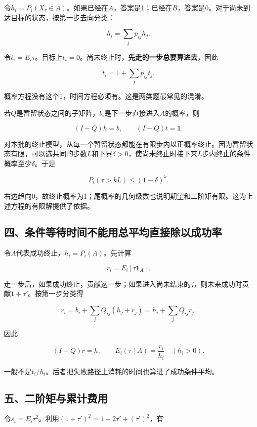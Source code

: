 \documentclass[
  11pt,
  a4paper,
  UTF8,
  fontset=fandol]{ctexart}
\begin{document}
令\(h_i=P_i(X_\tau\in A)\)。如果已经在\(A\)，答案是1；已经在\(B\)，答案是0。对于尚未到达目标的状态，按第一步去向分类：

\[
h_i=\sum_jp_{ij}h_j.
\]

令\(t_i=E_i\tau\)。目标上\(t_i=0\)。尚未终止时，\textbf{先走的一步总要算进去}，因此

\[
t_i=1+\sum_jp_{ij}t_j.
\]

概率方程没有这个1，时间方程必须有。这是两类题最常见的混淆。

若\(Q\)是暂留状态之间的子矩阵，\(b_i\)是下一步直接进入\(A\)的概率，则

\[
(I-Q)h=b,\qquad (I-Q)t=\boldsymbol1.
\]

对本批的终止模型，从每一个暂留状态都能在有限步内以正概率终止。因为暂留状态有限，可以选共同的步数\(L\)和下界\(\delta>0\)，使尚未终止时接下来\(L\)步内终止的条件概率至少\(\delta\)。于是

\[
P_i(\tau>kL)\le(1-\delta)^k.
\]

右边趋向0，故终止概率为1；尾概率的几何级数也说明期望和二阶矩有限。这为上述方程的有限解提供了依据。

\subsection{四、条件等待时间不能用总平均直接除以成功率}\label{ux56dbux6761ux4ef6ux7b49ux5f85ux65f6ux95f4ux4e0dux80fdux7528ux603bux5e73ux5747ux76f4ux63a5ux9664ux4ee5ux6210ux529fux7387}

令\(A\)代表成功终止，\(h_i=P_i(A)\)。先计算

\[
r_i=E_i[\tau\boldsymbol1_A].
\]

走一步后，如果成功终止，贡献这一步；如果进入尚未结束的\(j\)，则未来成功时贡献\(1+\tau'\)。按第一步分类得

\[
r_i=b_i+\sum_jQ_{ij}(h_j+r_j)
=h_i+\sum_jQ_{ij}r_j.
\]

因此

\[
(I-Q)r=h,\qquad E_i(\tau\mid A)=\frac{r_i}{h_i}\quad(h_i>0).
\]

一般不是\(t_i/h_i\)。后者把失败路径上消耗的时间也算进了成功条件平均。

\subsection{五、二阶矩与累计费用}\label{ux4e94ux4e8cux9636ux77e9ux4e0eux7d2fux8ba1ux8d39ux7528}

令\(s_i=E_i\tau^2\)。利用\((1+\tau')^2=1+2\tau'+(\tau')^2\)，有
\end{document}
